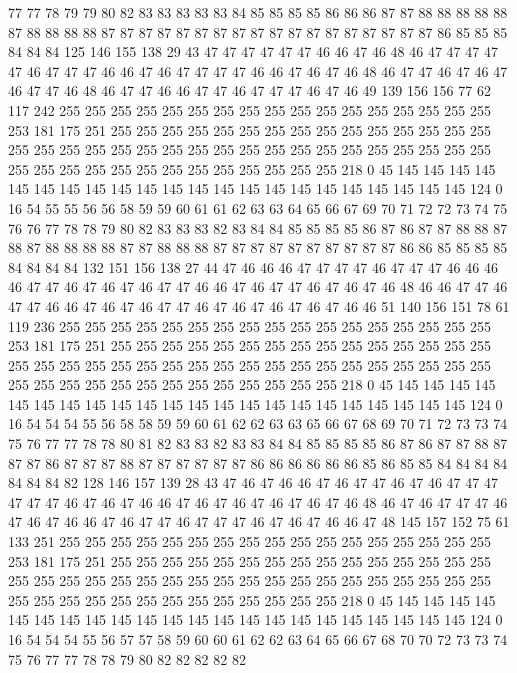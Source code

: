 77 77 78 79 79 80 82 83 83 83 83 83 84 85 85 85 85 86 86 86
87 87 88 88 88 88 88 87 88 88 88 88 87 87 87 87 87 87 87 87
87 87 87 87 87 87 87 87 87 87 86 85 85 85 84 84 84 125 146 155
138 29 43 47 47 47 47 47 47 46 46 47 46 48 46 47 47 47 47 47
46 47 47 47 46 46 47 46 47 47 47 47 46 46 47 46 47 46 48 46
47 47 46 47 46 47 46 47 47 46 48 46 47 47 46 46 47 47 46 47
47 47 46 47 46 49 139 156 156 77 62 117 242 255 255 255 255 255 255 255
255 255 255 255 255 255 255 255 255 255 253 181 175 251 255 255 255 255 255 255
255 255 255 255 255 255 255 255 255 255 255 255 255 255 255 255 255 255 255 255
255 255 255 255 255 255 255 255 255 255 255 255 255 255 255 255 255 255 255 255
255 218 0 45 145 145 145 145 145 145 145 145 145 145 145 145 145 145 145 145
145 145 145 145 145 145 124 0 16 54 55 55 56 56 58 59 59 60 61 61
62 63 63 64 65 66 67 69 70 71 72 72 73 74 75 76 76 77 78 78
79 80 82 83 83 83 82 83 84 84 85 85 85 85 86 87 86 87 87 88
88 87 88 87 88 88 88 88 87 87 88 88 88 87 87 87 87 87 87 87
87 87 87 86 86 85 85 85 85 84 84 84 84 132 151 156 138 27 44 47
46 46 46 47 47 47 47 46 47 47 47 46 46 46 46 47 47 46 47 46
47 46 47 47 46 46 47 46 47 47 46 47 46 47 46 48 46 46 47 47
46 47 47 46 46 47 46 47 46 47 47 46 47 46 47 46 47 46 47 46
46 51 140 156 151 78 61 119 236 255 255 255 255 255 255 255 255 255 255 255
255 255 255 255 255 255 253 181 175 251 255 255 255 255 255 255 255 255 255 255
255 255 255 255 255 255 255 255 255 255 255 255 255 255 255 255 255 255 255 255
255 255 255 255 255 255 255 255 255 255 255 255 255 255 255 255 255 218 0 45
145 145 145 145 145 145 145 145 145 145 145 145 145 145 145 145 145 145 145 145
145 145 124 0 16 54 54 54 55 56 58 58 59 59 60 61 62 62 63 63
65 66 67 68 69 70 71 72 73 73 74 75 76 77 77 78 78 80 81 82
83 83 82 83 83 84 84 85 85 85 85 86 87 86 87 87 88 87 87 87
86 87 87 87 88 87 87 87 87 87 87 86 86 86 86 86 86 85 86 85
85 84 84 84 84 84 84 84 82 128 146 157 139 28 43 47 46 47 46 46
47 46 47 47 46 47 46 47 47 47 47 47 47 46 47 46 47 46 46 47
46 47 46 47 46 47 46 47 46 48 46 47 46 47 47 47 46 47 46 47
46 46 47 46 47 47 46 47 47 47 46 47 46 47 46 46 47 48 145 157
152 75 61 133 251 255 255 255 255 255 255 255 255 255 255 255 255 255 255 255
255 255 253 181 175 251 255 255 255 255 255 255 255 255 255 255 255 255 255 255
255 255 255 255 255 255 255 255 255 255 255 255 255 255 255 255 255 255 255 255
255 255 255 255 255 255 255 255 255 255 255 255 255 218 0 45 145 145 145 145
145 145 145 145 145 145 145 145 145 145 145 145 145 145 145 145 145 145 124 0
16 54 54 54 55 56 57 57 58 59 60 60 61 62 62 63 64 65 66 67
68 70 70 72 73 73 74 75 76 77 77 78 78 79 80 82 82 82 82 82
